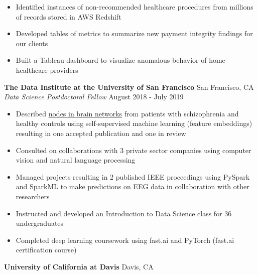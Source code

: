 \documentclass[line,margin,10pt]{res}
\begin{document}
\begin{resume}
\begin{itemize}
\item Identified instances of non-recommended healthcare procedures from millions of records stored in AWS Redshift
\item Developed tables of metrics to summarize new payment integrity findings for our clients
\item Built a Tableau dashboard to visualize anomalous behavior of home healthcare providers
\end{itemize}
{\vspace{-0.25cm}}
\textbf{The Data Institute at the University of San Francisco} \hfill San Francisco, CA \\
{\sl Data Science Postdoctoral Fellow} \hfill August 2018 - July 2019
\begin{itemize} \itemsep -2pt
\item Described \href{https://www.youtube.com/watch?v=8Ng_aMgIZLw&feature=youtu.be}{nodes in brain networks} from patients with schizophrenia and healthy controls using self-supervised machine learning (feature embeddings) resulting in one accepted publication and one in review
\item Consulted on collaborations with 3 private sector companies using computer vision and natural language processing
\item Managed projects resulting in 2 published IEEE proceedings using PySpark and SparkML to make predictions on EEG data in collaboration with other researchers
\item Instructed and developed an Introduction to Data Science class for 36 undergraduates
\item Completed deep learning coursework using fast.ai and PyTorch (fast.ai certification course)
\end{itemize}
{\vspace{-0.25cm}}
\textbf{University of California at Davis} \hfill Davis, CA \\

\end{resume}
\end{document}
